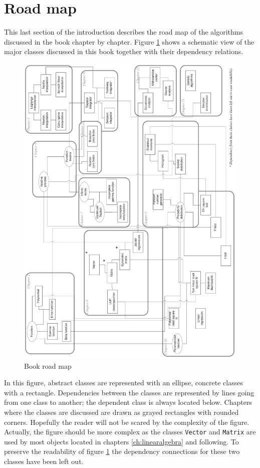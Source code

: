 \documentclass[twoside]{book}
\begin{document}
\section{Road map}
This last section of the introduction describes the road map of
the algorithms discussed in the book chapter by chapter. Figure
\ref{fig:roadmap} shows a schematic view of the major classes
discussed in this book together with their dependency relations.
\begin{figure}
\centering\includegraphics[width=13cm]{Figures/Roadmap}
\caption{Book road map} \label{fig:roadmap}
\end{figure}
In this figure, abstract classes are represented with an ellipse,
concrete classes with a rectangle. Dependencies between the
classes are represented by lines going from one class to another;
the dependent class is always located below. Chapters where the
classes are discussed are drawn as grayed rectangles with rounded
corners. Hopefully the reader will not be scared by the complexity
of the figure. Actually, the figure should be more complex as the
classes {\tt Vector} and {\tt Matrix} are used by most objects
located in chapters \ref{ch:linearalgebra} and following. To
preserve the readability of figure \ref{fig:roadmap} the
dependency connections for these two classes have been left out.
\end{document}
